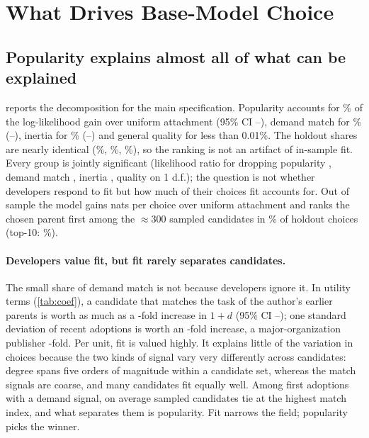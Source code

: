 \section{What Drives Base-Model Choice}
\label{sec:results}



\subsection{Popularity explains almost all of what can be explained}
 reports the decomposition for the main specification. Popularity accounts for
\shPopularity\% of the log-likelihood gain over uniform attachment (95\% CI \shPopularityLo--\shPopularityHi),
demand match for \shMatch\% (\shMatchLo--\shMatchHi), inertia for \shInertia\% (\shInertiaLo--\shInertiaHi) and
general quality for less than 0.01\%. The holdout shares are nearly identical (\shHoldPopularity\%, \shHoldMatch\%,
\shHoldInertia\%), so the ranking is not an artifact of in-sample fit. Every group is jointly significant (likelihood
ratio for dropping popularity \lrPop, demand match \lrMatch, inertia \lrInertia, quality \lrQual{} on 1 d.f.); the
question is not whether developers respond to fit but how much of their choices fit accounts for. Out of sample the
model gains \holdGain{} nats per choice over uniform attachment and ranks the chosen parent first among the
$\approx$300 sampled candidates in \holdTopOne\% of holdout choices (top-10: \holdTopTen\%).

\paragraph{Developers value fit, but fit rarely separates candidates.}
The small share of demand match is not because developers ignore it. In utility terms (\cref{tab:coef}), a
candidate that matches the task of the author's earlier parents is worth as much as a \mrsTask-fold increase in
$1+d$ (95\% CI \mrsTaskLo--\mrsTaskHi); one standard deviation of recent adoptions is worth an \mrsRec-fold increase,
a major-organization publisher \mrsOrg-fold. Per unit, fit is valued highly. It explains little of the variation in
choices because the two kinds of signal vary very differently across candidates: degree spans five orders of
magnitude within a candidate set, whereas the match signals are coarse, and many candidates fit equally well. Among
first adoptions with a demand signal, on average \tieMean{} sampled candidates tie at the highest match index, and
what separates them is popularity. Fit narrows the field; popularity picks the winner.

